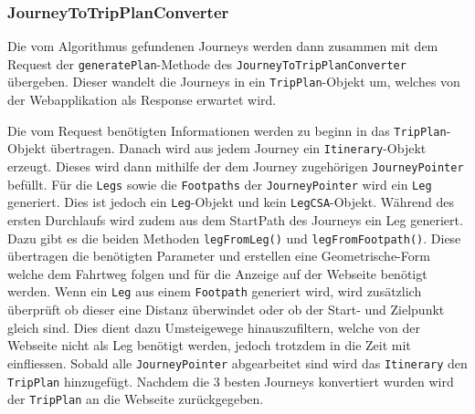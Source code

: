 \subsubsection{JourneyToTripPlanConverter}
Die vom Algorithmus gefundenen Journeys werden dann zusammen mit dem Request der \texttt{generatePlan}-Methode des \texttt{JourneyToTripPlanConverter} übergeben. Dieser wandelt die Journeys in ein \texttt{TripPlan}-Objekt um, welches von der Webapplikation als Response erwartet wird.

Die vom Request benötigten Informationen werden zu beginn in das \texttt{TripPlan}-Objekt übertragen. Danach wird aus jedem Journey ein \texttt{Itinerary}-Objekt erzeugt. Dieses wird dann mithilfe der dem Journey zugehörigen \texttt{JourneyPointer} befüllt. Für die \texttt{Legs} sowie die \texttt{Footpaths} der \texttt{JourneyPointer} wird ein \texttt{Leg} generiert. Dies ist jedoch ein \texttt{Leg}-Objekt und kein \texttt{LegCSA}-Objekt. Während des ersten Durchlaufs wird zudem aus dem StartPath des Journeys ein Leg generiert. Dazu gibt es die beiden Methoden \texttt{legFromLeg()} und \texttt{legFromFootpath()}. Diese übertragen die benötigten Parameter und erstellen eine Geometrische-Form welche dem Fahrtweg folgen und für die Anzeige auf der Webseite benötigt werden. Wenn ein \texttt{Leg} aus einem \texttt{Footpath} generiert wird, wird zusätzlich überprüft ob dieser eine Distanz überwindet oder ob der Start- und Zielpunkt gleich sind. Dies dient dazu Umsteigewege hinauszufiltern, welche von der Webseite nicht als Leg benötigt werden, jedoch trotzdem in die Zeit mit einfliessen. Sobald alle \texttt{JourneyPointer} abgearbeitet sind wird das \texttt{Itinerary} den \texttt{TripPlan} hinzugefügt. Nachdem die 3 besten Journeys konvertiert wurden wird der \texttt{TripPlan} an die Webseite zurückgegeben.
